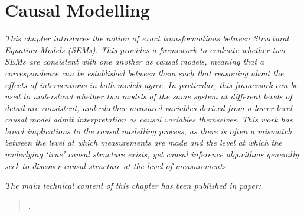 \chapter{Causal Modelling}\label{chapter:causality}

\ifpdf
    \graphicspath{{Chapter3/Figs/Raster/}{Chapter3/Figs/PDF/}{Chapter3/Figs/}}
\else
    \graphicspath{{Chapter3/Figs/Vector/}{Chapter3/Figs/}}
\fi

\emph{This chapter introduces the notion of \emph{exact transformations} between Structural Equation Models (SEMs).
This provides a framework to evaluate whether two SEMs are consistent with one another as causal models, meaning that a correspondence can be established between them such that reasoning about the effects of interventions in both models agree.
In particular, this framework can be used to understand whether two models of the same system at different levels of detail are consistent, and whether measured variables derived from a lower-level causal model admit interpretation as causal variables themselves.
This work has broad implications to the causal modelling process, as 
there is often a mismatch between the level at which measurements are made and the level at which the underlying `true' causal structure exists,
yet causal inference algorithms generally seek to discover causal structure at the level of measurements.}


\emph{The main technical content of this chapter has been published in paper:}


\begin{quote}
.
\end{quote}
%
%
%
%
%
%
%

